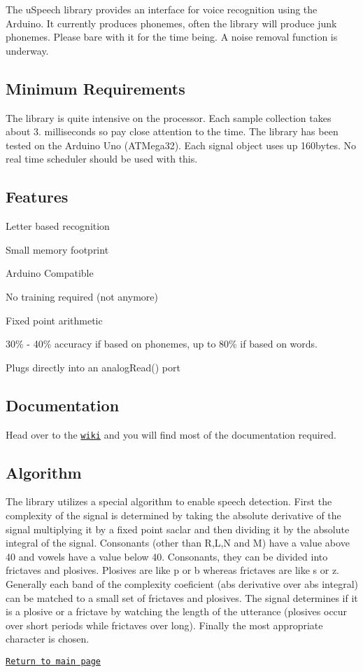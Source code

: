 The u\-Speech library provides an interface for voice recognition using the Arduino. It currently produces phonemes, often the library will produce junk phonemes. Please bare with it for the time being. A noise removal function is underway. \subsection*{Minimum Requirements}

The library is quite intensive on the processor. Each sample collection takes about 3. milliseconds so pay close attention to the time. The library has been tested on the Arduino Uno (A\-T\-Mega32). Each signal object uses up 160bytes. No real time scheduler should be used with this.

\subsection*{Features}


\begin{DoxyItemize}
\item Letter based recognition
\item Small memory footprint
\item Arduino Compatible
\item No training required (not anymore)
\item Fixed point arithmetic
\item 30\% -\/ 40\% accuracy if based on phonemes, up to 80\% if based on words.
\item Plugs directly into an {\ttfamily analog\-Read()} port
\end{DoxyItemize}

\subsection*{Documentation}

Head over to the \href{https://github.com/arjo129/uSpeech/wiki}{\tt wiki} and you will find most of the documentation required.

\subsection*{Algorithm}

The library utilizes a special algorithm to enable speech detection. First the complexity of the signal is determined by taking the absolute derivative of the signal multiplying it by a fixed point saclar and then dividing it by the absolute integral of the signal. Consonants (other than R,L,N and M) have a value above 40 and vowels have a value below 40. Consonants, they can be divided into frictaves and plosives. Plosives are like p or b whereas frictaves are like s or z. Generally each band of the complexity coeficient (abs derivative over abs integral) can be matched to a small set of frictaves and plosives. The signal determines if it is a plosive or a frictave by watching the length of the utterance (plosives occur over short periods while frictaves over long). Finally the most appropriate character is chosen.


\begin{DoxyItemize}
\item \href{http://arjo129.github.com}{\tt Return to main page} 
\end{DoxyItemize}